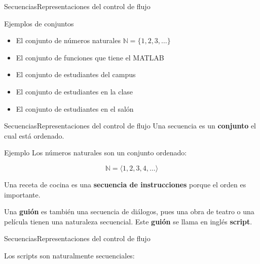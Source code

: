 \documentclass[spanish, c]{beamer}
\begin{document}
\begin{frame}{Secuencias}{Representaciones del control de flujo}
    \begin{exampleblock}{Ejemplos de conjuntos}
        \begin{itemize}[<+->]
            \itemsep3.5ex
            \item El conjunto de números naturales $\mathbb{N} = \{1, 2, 3, \dots\}$
            \item El conjunto de funciones que tiene el MATLAB
            \item El conjunto de estudiantes del campus
            \item El conjunto de estudiantes en la clase
            \item El conjunto de estudiantes en el salón
        \end{itemize}
    \end{exampleblock}
\end{frame}

\begin{frame}{Secuencias}{Representaciones del control de flujo}
    Una \alert{secuencia} es un \textbf{conjunto} el cual está \alert{ordenado}. \pause

    \begin{exampleblock}{Ejemplo}
        Los números naturales son un conjunto ordenado:

        $$\mathbb{N} = \langle 1, 2, 3, 4, \dots \rangle$$
        
    \end{exampleblock} \pause

    Una receta de cocina es una \textbf{secuencia de instrucciones} porque el orden es importante. \pause
    
    Una \textbf{guión} es también una secuencia de diálogos, pues una obra de teatro o una película tienen una naturaleza secuencial.
    Este \textbf{guión} se llama en inglés \textbf{script}.
\end{frame}

\begin{frame}[fragile]{Secuencias}{Representaciones del control de flujo}

    Los \alert{scripts} son naturalmente secuenciales:

    \bigskip

    \begin{columns}
        \begin{column}{0.95\linewidth}
            
        \end{column}
    \end{columns}

\end{frame}
\end{document}
